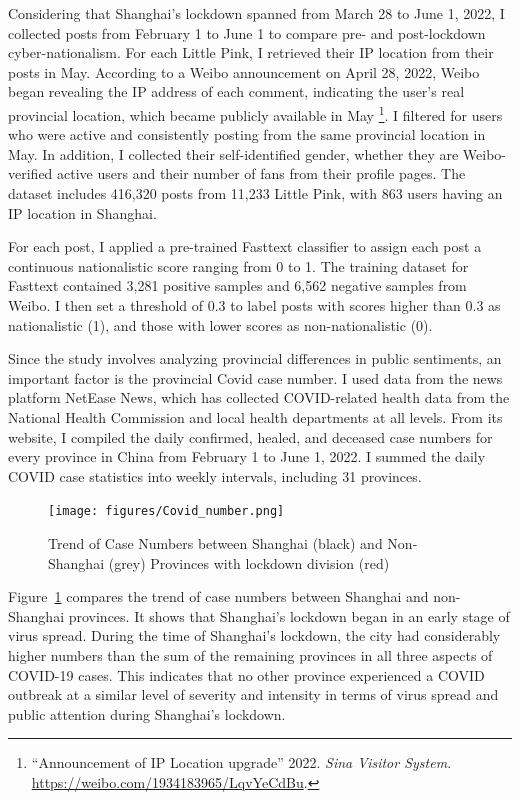 \documentclass[12pt, ]{article}
\begin{document}
Considering that Shanghai’s lockdown spanned from March 28 to June 1, 2022, I collected posts from February 1 to June 1 to compare pre- and post-lockdown cyber-nationalism. For each Little Pink, I retrieved their IP location from their posts in May. According to a Weibo announcement on April 28, 2022, Weibo began revealing the IP address of each comment, indicating the user's real provincial location, which became publicly available in May \footnote{``Announcement of IP Location upgrade'' 2022. \emph{Sina Visitor System}.  \url{https://weibo.com/1934183965/LqvYeCdBu}.}. I filtered for users who were active and consistently posting from the same provincial location in May. In addition, I collected their self-identified gender, whether they are Weibo-verified active users and their number of fans from their profile pages. The dataset includes 416,320 posts from 11,233 Little Pink, with 863 users having an IP location in Shanghai.

For each post, I applied a pre-trained Fasttext classifier to assign each post a continuous nationalistic score ranging from 0 to 1. The training dataset for Fasttext contained 3,281 positive samples and 6,562 negative samples from Weibo. I then set a threshold of 0.3 to label posts with scores higher than 0.3 as nationalistic (1), and those with lower scores as non-nationalistic (0).

Since the study involves analyzing provincial differences in public sentiments, an important factor is the provincial Covid case number. I used data from the news platform NetEase News, which has collected COVID-related health data from the National Health Commission and local health departments at all levels. From its website, I compiled the daily confirmed, healed, and deceased case numbers for every province in China from February 1 to June 1, 2022. I summed the daily COVID case statistics into weekly intervals, including 31 provinces. 

\begin{figure}[]

{\centering \texttt{[image: figures/Covid\_number.png]}}
\caption{\label{fig-covid}Trend of Case Numbers between Shanghai (black) and Non-Shanghai (grey) Provinces with lockdown division (red)}

\end{figure}

Figure~\ref{fig-covid} compares the trend of case numbers between Shanghai and non-Shanghai provinces. It shows that Shanghai’s lockdown began in an early stage of virus spread. During the time of Shanghai’s lockdown, the city had considerably higher numbers than the sum of the remaining provinces in all three aspects of COVID-19 cases. This indicates that no other province experienced a COVID outbreak at a similar level of severity and intensity in terms of virus spread and public attention during Shanghai’s lockdown.
\end{document}
